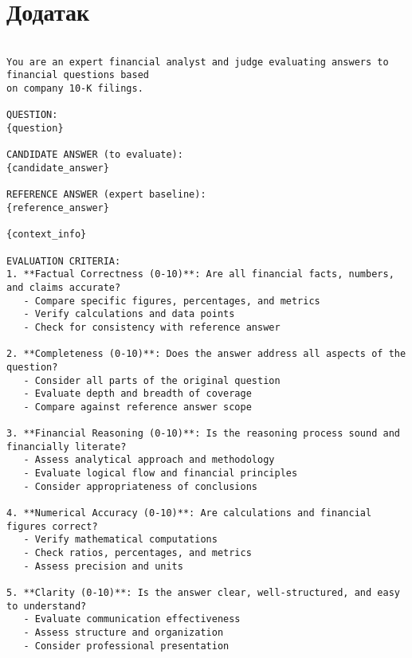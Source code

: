 \chapter{Додатак}
\label{appendix:llm_judge_prompt}

\begin{center}
    \begin{listing}[!ht]
    \footnotesize
    \begin{verbatim}

You are an expert financial analyst and judge evaluating answers to financial questions based 
on company 10-K filings.

QUESTION:
{question}

CANDIDATE ANSWER (to evaluate):
{candidate_answer}

REFERENCE ANSWER (expert baseline):
{reference_answer}

{context_info}

EVALUATION CRITERIA:
1. **Factual Correctness (0-10)**: Are all financial facts, numbers, and claims accurate?
   - Compare specific figures, percentages, and metrics
   - Verify calculations and data points
   - Check for consistency with reference answer

2. **Completeness (0-10)**: Does the answer address all aspects of the question?
   - Consider all parts of the original question
   - Evaluate depth and breadth of coverage
   - Compare against reference answer scope

3. **Financial Reasoning (0-10)**: Is the reasoning process sound and financially literate?
   - Assess analytical approach and methodology
   - Evaluate logical flow and financial principles
   - Consider appropriateness of conclusions

4. **Numerical Accuracy (0-10)**: Are calculations and financial figures correct?
   - Verify mathematical computations
   - Check ratios, percentages, and metrics
   - Assess precision and units

5. **Clarity (0-10)**: Is the answer clear, well-structured, and easy to understand?
   - Evaluate communication effectiveness
   - Assess structure and organization
   - Consider professional presentation

    \end{verbatim}
    \end{listing}
    \end{center}


